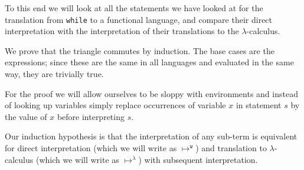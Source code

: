 \documentclass[11pt, leqno, titlepage]{article}
\theoremstyle{definition}
\begin{document}
To this end we will look at all the statements we have looked at for the translation
from \texttt{while} to a functional language, and compare their direct interpretation
with the interpretation of their translations to the $\lambda$-calculus. 

We prove that the triangle commutes by induction. The base cases are the expressions;
since these are the same in all languages and evaluated in the same way, they are
trivially true.

For the proof we will allow ourselves to be sloppy with environments and instead of
looking up variables simply replace occurrences of variable $x$ in statement $s$ by
the value of $x$ before interpreting $s$.

Our induction hypothesis is that the interpretation of any sub-term is equivalent for
direct interpretation (which we will write as $\mapsto^{\texttt{w}}$) and translation
to $\lambda$-calculus (which we will write as $\mapsto^\lambda$) with subsequent
interpretation. 
\end{document}
